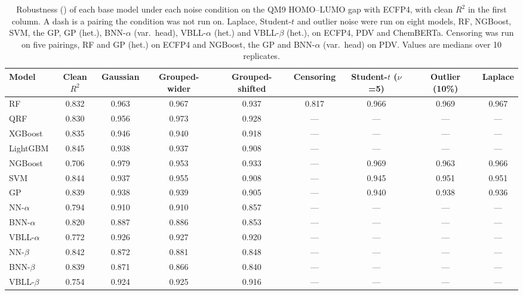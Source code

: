 \begin{table}[!htbp]
\centering
\small
\begin{adjustbox}{max width=\textwidth,max totalheight=0.78\textheight}
\begin{tabular}{lcccccccc}
\toprule
Model & Clean $R^2$ & Gaussian & Grouped-wider & Grouped-shifted & Censoring & Student-$t$ ($\nu$=5) & Outlier (10\%) & Laplace \\
\midrule
RF & 0.832 & 0.963 & 0.967 & 0.937 & 0.817 & 0.966 & 0.969 & 0.967 \\
QRF & 0.830 & 0.956 & 0.973 & 0.928 & --- & --- & --- & --- \\
XGBoost & 0.835 & 0.946 & 0.940 & 0.918 & --- & --- & --- & --- \\
LightGBM & 0.845 & 0.938 & 0.937 & 0.908 & --- & --- & --- & --- \\
NGBoost & 0.706 & 0.979 & 0.953 & 0.933 & --- & 0.969 & 0.963 & 0.966 \\
SVM & 0.844 & 0.937 & 0.955 & 0.908 & --- & 0.945 & 0.951 & 0.951 \\
GP & 0.839 & 0.938 & 0.939 & 0.905 & --- & 0.940 & 0.938 & 0.936 \\
NN-$\alpha$ & 0.794 & 0.910 & 0.910 & 0.857 & --- & --- & --- & --- \\
BNN-$\alpha$ & 0.820 & 0.887 & 0.886 & 0.853 & --- & --- & --- & --- \\
VBLL-$\alpha$ & 0.772 & 0.926 & 0.927 & 0.920 & --- & --- & --- & --- \\
NN-$\beta$ & 0.842 & 0.872 & 0.881 & 0.848 & --- & --- & --- & --- \\
BNN-$\beta$ & 0.839 & 0.871 & 0.866 & 0.840 & --- & --- & --- & --- \\
VBLL-$\beta$ & 0.754 & 0.924 & 0.925 & 0.916 & --- & --- & --- & --- \\
\bottomrule
\end{tabular}
\end{adjustbox}
\caption[Robustness of each base model under each noise condition on QM9.]{Robustness (\aucnorm) of each base model under each noise condition on the QM9 HOMO--LUMO gap with ECFP4, with clean $R^2$ in the first column. A dash is a pairing the condition was not run on. Laplace, Student-$t$ and outlier noise were run on eight models, RF, NGBoost, SVM, the GP, GP (het.), BNN-$\alpha$ (var.\ head), VBLL-$\alpha$ (het.) and VBLL-$\beta$ (het.), on ECFP4, PDV and ChemBERTa. Censoring was run on five pairings, RF and GP (het.) on ECFP4 and NGBoost, the GP and BNN-$\alpha$ (var.\ head) on PDV. Values are medians over 10 replicates.}
\label{tab:robustness}
\end{table}

